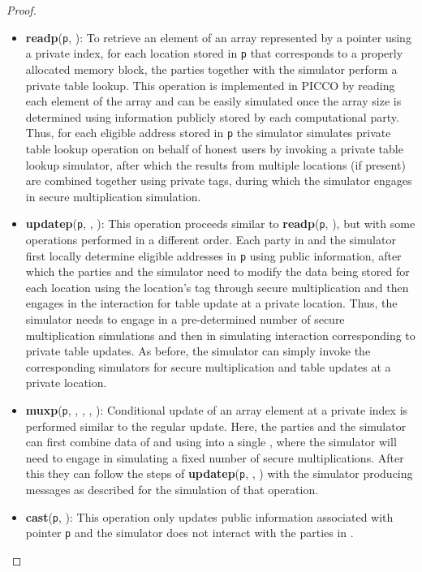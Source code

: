 \documentclass[11pt]{article}
\begin{document}
\begin{proof}
\begin{itemize}
  \item \textbf{readp}(\texttt{p}, ): To retrieve an element of an array
    represented by a pointer using a private index, for each location stored
    in \texttt{p} that corresponds to a properly allocated memory block, the
    parties together with the simulator perform a private table lookup. This
    operation is implemented in PICCO by reading each element of the array
    and can be easily simulated once the array size is determined using
    information publicly stored by each computational party. Thus, for each
    eligible address stored in \texttt{p} the simulator simulates private
    table lookup operation on behalf of honest users by invoking a private
    table lookup simulator, after which the results from multiple locations
    (if present) are combined together using private tags, during which the
    simulator engages in secure multiplication simulation.
    
  \item \textbf{updatep}(\texttt{p}, , ): This operation proceeds
    similar to \textbf{readp}(\texttt{p}, ), but with some operations
    performed in a different order. Each party in  and the simulator
    first locally determine eligible addresses in \texttt{p} using public
    information, after which the parties and the simulator need to modify
    the data being stored for each location using the location's tag through
    secure multiplication and then engages in the interaction for table
    update at a private location. Thus, the simulator needs to engage in a
    pre-determined number of secure multiplication simulations and then in
    simulating interaction corresponding to private table updates. As
    before, the simulator can simply invoke the corresponding simulators for
    secure multiplication and table updates at a private location.
    
  \item \textbf{muxp}(\texttt{p}, , , , ): Conditional
    update of an array element at a private index is performed similar to
    the regular update. Here, the parties and the simulator can first
    combine data of  and  using  into a single , where
    the simulator will need to engage in simulating a fixed number of secure
    multiplications. After this they can follow the steps of
    \textbf{updatep}(\texttt{p}, , ) with the simulator producing
    messages as described for the simulation of that operation.
    
  \item \textbf{cast}(\texttt{p}, ): This operation only updates
    public information associated with pointer \texttt{p} and the simulator
    does not interact with the parties in .


\end{itemize}
\end{proof}
\end{document}
